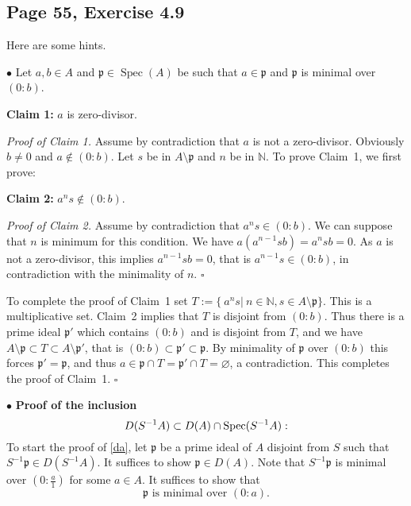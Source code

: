\documentclass[parskip=half,fontsize=12pt]{scrartcl}%
\newcommand{\oo}{\operatorname}\newcommand{\ooo}{\operatorname*}
\newcommand{\mf}{\mathfrak}
\newcommand{\ppp}{\mf p}
\newcommand{\bu}{\bullet}
\begin{document}
\subsection{Page 55, Exercise 4.9}%

Here are some hints.

$\bu$ Let $a,b\in A$ and $\ppp\in\oo{Spec}(A)$ be such that $a\in\ppp$ and $\ppp$ is minimal over $(0:b)$.

\textbf{Claim 1:} $a$ is zero-divisor.

\emph{Proof of Claim 1.} Assume by contradiction that $a$ is not a zero-divisor. Obviously $b\ne0$ and $a\notin(0:b)$. Let $s$ be in $A\setminus\ppp$ and $n$ be in $\mathbb N$. To prove Claim~1, we first prove:

\textbf{Claim 2:} $a^ns\notin(0:b)$.

\emph{Proof of Claim 2.} Assume by contradiction that $a^ns\in(0:b)$. We can suppose that $n$ is minimum for this condition. %
We have $a(a^{n-1}sb)=a^nsb=0$. As $a$ is not a zero-divisor, this implies $a^{n-1}sb=0$, that is $a^{n-1}s\in(0:b)$, in contradiction with the minimality of $n$. $\square$

To complete the proof of Claim~1 set $T:=\{\ a^ns|\ n\in\mathbb N,s\in A\setminus\ppp\}$. This is a multiplicative set. Claim~2 implies that $T$ is disjoint from $(0:b)$. Thus there is a prime ideal $\ppp'$ which contains $(0:b)$ and is disjoint from $T$, and we have $A\setminus\ppp\subset T\subset A\setminus\ppp'$, that is $(0:b)\subset\ppp'\subset\ppp$. By minimality of $\ppp$ over $(0:b)$ this forces $\ppp'=\ppp$, and thus $a\in\ppp\cap T=\ppp'\cap T=\varnothing$, a contradiction. This completes the proof of Claim~1. $\square$ 

$\bu$ \textbf{Proof of the inclusion} 
\begin{equation}\label{da}
D(S^{-1}A)\subset D(A)\cap\operatorname{Spec}(S^{-1}A):
\end{equation}
To start the proof of \eqref{da}, let $\ppp$ be a prime ideal of $A$ disjoint from $S$ such that $S^{-1}\ppp\in D(S^{-1}A)$. It suffices to show $\ppp\in D(A)$. Note that $S^{-1}\ppp$ is minimal over $(0:\frac a1)$ for some $a\in A$. %
It suffices to show that %
\begin{equation}\label{da2}
\ppp\text{ is minimal over }(0:a).
\end{equation}
\end{document}

